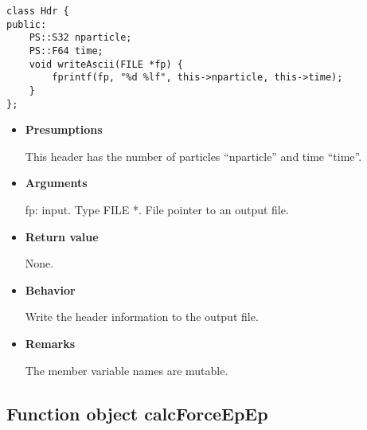 
\begin{screen}
\begin{verbatim}
class Hdr {
public:
    PS::S32 nparticle;
    PS::F64 time;
    void writeAscii(FILE *fp) {
        fprintf(fp, "%d %lf", this->nparticle, this->time);
    }
};
\end{verbatim}
\end{screen}

\begin{itemize}

\item {\bf Presumptions}

  This header has the number of particles ``nparticle'' and time
  ``time''.

\item {\bf Arguments}

  fp: input. Type FILE *. File pointer to an output file.
  
\item {\bf Return value}

  None.
  
\item {\bf Behavior}

  Write the header information to the output file.
  
\item {\bf Remarks}

  The member variable names are mutable.
  
\end{itemize}

\subsection{Function object calcForceEpEp}
\label{sec:example_userdefined_calcForceEpEp}

